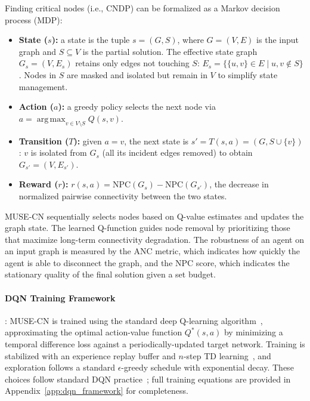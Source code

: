 \documentclass{article}
\DeclareMathOperator*{\argmax}{arg\,max}
\begin{document}
Finding critical nodes (i.e., CNDP) can be formalized as a Markov decision process (MDP):
\begin{itemize}[leftmargin=*]
    \item \textbf{State ($s$):} a state is the tuple $s=(G,S)$, where $G=(V,E)$ is the input graph and $S \subseteq V$ is the partial solution. The effective state graph $G_s = (V, E_s)$ retains only edges not touching $S$: $E_s = \{\{u,v\} \in E \mid u,v \notin S\}$. Nodes in $S$ are masked and isolated but remain in $V$ to simplify state management.
    \item \textbf{Action ($a$):} a greedy policy selects the next node via $a = \argmax_{v \in V\setminus S} Q(s,v)$.
    \item \textbf{Transition ($T$):} given $a=v$, the next state is $s' = T(s,a) = (G, S \cup \{v\})$: $v$ is isolated from $G_s$ (all its incident edges removed) to obtain $G_{s'} = (V, E_{s'})$.
    \item \textbf{Reward ($r$):} $r(s,a) = \mathrm{NPC}(G_s) - \mathrm{NPC}(G_{s'})$, the decrease in normalized pairwise connectivity between the two states.
\end{itemize}
MUSE-CN sequentially selects nodes based on Q-value estimates and updates the graph state.  The learned Q-function guides node removal by prioritizing those that maximize long-term connectivity degradation. The robustness of an agent on an input graph is measured by the ANC metric, which indicates how quickly the agent is able to disconnect the graph, and the NPC score, which indicates the stationary quality of the final solution given a set budget.



\paragraph{DQN Training Framework}: MUSE-CN is trained using the standard deep Q-learning algorithm~\cite{mnih2015human}, approximating the optimal action-value function $Q^*(s,a)$ by minimizing a temporal difference loss against a periodically-updated target network. Training is stabilized with an experience replay buffer and $n$-step TD learning~\cite{sutton2018reinforcement}, and exploration follows a standard $\epsilon$-greedy schedule with exponential decay. These choices follow standard DQN practice~\cite{mnih2015human,sutton2018reinforcement}; full training equations are provided in Appendix~\ref{app:dqn_framework} for completeness.
\end{document}

